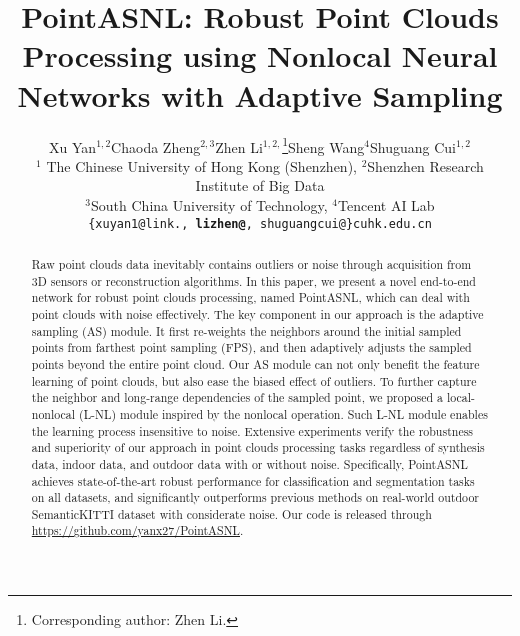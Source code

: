 \documentclass[10pt,twocolumn,letterpaper]{article}
\begin{document}
	
\title{PointASNL: Robust Point Clouds Processing using Nonlocal Neural Networks with Adaptive Sampling}
	


	\author{Xu Yan$^{1,2}$\quad Chaoda Zheng$^{2,3}$\quad Zhen Li$^{1,2,}$\thanks{{ Corresponding author: Zhen Li.}}\quad Sheng Wang$^4$\quad Shuguang Cui$^{1,2}$ \\
		$^1$ The Chinese University of Hong Kong (Shenzhen), $^2$Shenzhen Research Institute of Big Data \\ 
		$^3$South China University of Technology, $^4$Tencent AI Lab\\
{\tt\small	\{xuyan1@link., \textbf{lizhen@}, shuguangcui@\}cuhk.edu.cn}}
	\maketitle


\begin{abstract}
		


		
		Raw point clouds data inevitably contains outliers or noise through acquisition from 3D sensors or reconstruction algorithms. In this paper, we present a novel end-to-end network for robust point clouds processing, named PointASNL, which can deal with point clouds with noise effectively. The key component in our approach is the adaptive sampling (AS) module. It first re-weights the neighbors around the initial sampled points from farthest point sampling (FPS), and then adaptively adjusts the sampled points beyond the entire point cloud. Our AS module can not only benefit the feature learning of point clouds, but also ease the biased effect of outliers. To further capture the neighbor and long-range dependencies of the sampled point, we proposed a local-nonlocal (L-NL) module inspired by the nonlocal operation. Such L-NL module enables the learning process insensitive to noise. Extensive experiments verify the robustness and superiority of our approach in point clouds processing tasks regardless of synthesis data, indoor data, and outdoor data with or without noise. Specifically, PointASNL achieves state-of-the-art robust performance for classification and segmentation tasks on all datasets, and significantly outperforms previous methods on real-world outdoor SemanticKITTI dataset with considerate noise. Our code is released through {\url{https://github.com/yanx27/PointASNL}}.
		




	\end{abstract}
	
\end{document}
